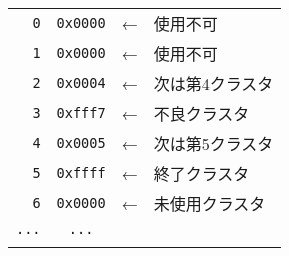 \documentclass[border=1mm]{standalone}
\def\|{\verb|} %|
\begin{document}
\begin{tabular}{r | c | c l}\cline{2-2}
  \|0| & \|0x0000| & ←  & 使用不可        \\\cline{2-2}
  \|1| & \|0x0000| & ←  & 使用不可        \\\cline{2-2}
  \|2| & \|0x0004| & ←  & 次は第4クラスタ \\\cline{2-2}
  \|3| & \|0xfff7| & ←  & 不良クラスタ    \\\cline{2-2}
  \|4| & \|0x0005| & ←  & 次は第5クラスタ \\\cline{2-2}
  \|5| & \|0xffff| & ←  & 終了クラスタ    \\\cline{2-2}
  \|6| & \|0x0000| & ←  & 未使用クラスタ  \\\cline{2-2}
\|...| & \|...|    &    &                 \\
       &           &    &                 \\\cline{2-2}
\end{tabular}
\end{document}
